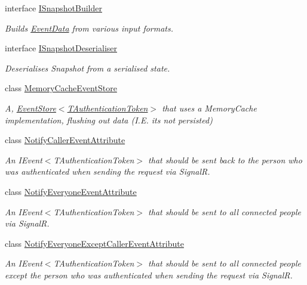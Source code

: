 \begin{DoxyCompactItemize}
interface \hyperlink{interfaceCqrs_1_1Events_1_1ISnapshotBuilder}{I\+Snapshot\+Builder}
\begin{DoxyCompactList}\small\item\em Builds \hyperlink{classCqrs_1_1Events_1_1EventData}{Event\+Data} from various input formats. \end{DoxyCompactList}\item 
interface \hyperlink{interfaceCqrs_1_1Events_1_1ISnapshotDeserialiser}{I\+Snapshot\+Deserialiser}
\begin{DoxyCompactList}\small\item\em Deserialises Snapshot from a serialised state. \end{DoxyCompactList}\item 
class \hyperlink{classCqrs_1_1Events_1_1MemoryCacheEventStore}{Memory\+Cache\+Event\+Store}
\begin{DoxyCompactList}\small\item\em A, \hyperlink{classCqrs_1_1Events_1_1EventStore_a6346cb2aea4c5b4e740dc6cfb15abab8_a6346cb2aea4c5b4e740dc6cfb15abab8}{Event\+Store$<$\+T\+Authentication\+Token$>$} that uses a Memory\+Cache implementation, flushing out data (I.\+E. it\textquotesingle{}s not persisted) \end{DoxyCompactList}\item 
class \hyperlink{classCqrs_1_1Events_1_1NotifyCallerEventAttribute}{Notify\+Caller\+Event\+Attribute}
\begin{DoxyCompactList}\small\item\em An I\+Event$<$\+T\+Authentication\+Token$>$ that should be sent back to the person who was authenticated when sending the request via SignalR. \end{DoxyCompactList}\item 
class \hyperlink{classCqrs_1_1Events_1_1NotifyEveryoneEventAttribute}{Notify\+Everyone\+Event\+Attribute}
\begin{DoxyCompactList}\small\item\em An I\+Event$<$\+T\+Authentication\+Token$>$ that should be sent to all connected people via SignalR. \end{DoxyCompactList}\item 
class \hyperlink{classCqrs_1_1Events_1_1NotifyEveryoneExceptCallerEventAttribute}{Notify\+Everyone\+Except\+Caller\+Event\+Attribute}
\begin{DoxyCompactList}\small\item\em An I\+Event$<$\+T\+Authentication\+Token$>$ that should be sent to all connected people except the person who was authenticated when sending the request via SignalR. \end{DoxyCompactList}\item 

\end{DoxyCompactItemize}
